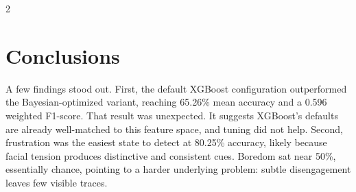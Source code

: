 \begin{multicols}{2}

  \section{Conclusions}


  A few findings stood out. First, the default XGBoost configuration outperformed the Bayesian-optimized variant, reaching 65.26\% mean accuracy and a 0.596 weighted F1-score. That result was unexpected. It suggests XGBoost's defaults are already well-matched to this feature space, and tuning did not help. Second, frustration was the easiest state to detect at 80.25\% accuracy, likely because facial tension produces distinctive and consistent cues. Boredom sat near 50\%, essentially chance, pointing to a harder underlying problem: subtle disengagement leaves few visible traces. %


\end{multicols}
